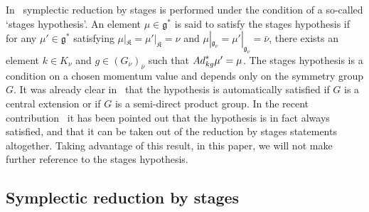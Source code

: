 \documentclass[11pt]{article}
\newcommand{\lag}{\mathfrak{g}}
\newcommand{\lak}{\mathfrak{K}}
\begin{document}
In~\cite{MarsdenHamRed} symplectic reduction by stages is performed under the condition of a so-called `stages hypothesis'. An element $\mu\in\lag^*$ is said to satisfy the stages hypothesis if for any $\mu'\in\lag^*$ satisfying $\mu|_\lak=\mu'|_\lak=\nu$ and $\mu|_{\lag_\nu} = \mu'|_{\lag_\nu} =\bar\nu$, there exists an element $k\in K_\nu$ and $g\in (G_\nu)_{\bar\nu}$ such that ${\rm Ad}^*_{kg} \mu'= \mu$.
The stages hypothesis is a condition on a chosen momentum value and depends only on the symmetry group $G$. It was already clear in~\cite{MarsdenHamRed} that the hypothesis is automatically satisf\/ied if $G$ is a central extension or if $G$ is a semi-direct product group. In the recent contribution~\cite{mikityuk} it has been pointed out that the hypothesis is in fact always satisf\/ied, and that it can be taken out of the reduction by stages statements altogether. Taking advantage of this result, in this paper, we will not make further reference to the stages hypothesis.


\subsection{Symplectic reduction by stages}\label{section6.1}
\end{document}
